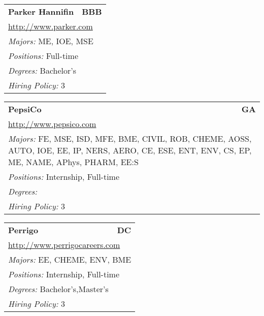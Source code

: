 \documentclass[twoside]{article}
\begin{document}
\begin{center}
\begin{multicols}{3}
\begin{FlushLeft}
\begin{minipage}{\columnwidth}\begin{tabularx}{.95\columnwidth}{Xr}
                 {\Large\bf Parker Hannifin} & {\Large\bf BBB}\\
    \multicolumn{2}{p{.95\columnwidth}}{\url{http://www.parker.com}}\\
    \multicolumn{2}{p{.95\columnwidth}}{\emph{Majors:} ME, IOE, MSE}\\
    \multicolumn{2}{p{.95\columnwidth}}{\emph{Positions:} Full-time}\\
    \multicolumn{2}{p{.95\columnwidth}}{\emph{Degrees:} Bachelor's}\\
    \multicolumn{2}{p{.95\columnwidth}}{\emph{Hiring Policy:} 3}\\
    \end{tabularx}
    
\end{minipage}
 
\begin{minipage}{\columnwidth}\begin{tabularx}{.95\columnwidth}{Xr}
                 {\Large\bf PepsiCo} & {\Large\bf GA}\\
    \multicolumn{2}{p{.95\columnwidth}}{\url{http://www.pepsico.com}}\\
    \multicolumn{2}{p{.95\columnwidth}}{\emph{Majors:} FE, MSE, ISD, MFE, BME, CIVIL, ROB, CHEME, AOSS, AUTO, IOE, EE, IP, NERS, AERO, CE, ESE, ENT, ENV, CS, EP, ME, NAME, APhys, PHARM, EE:S}\\
    \multicolumn{2}{p{.95\columnwidth}}{\emph{Positions:} Internship, Full-time}\\
    \multicolumn{2}{p{.95\columnwidth}}{\emph{Degrees:} }\\
    \multicolumn{2}{p{.95\columnwidth}}{\emph{Hiring Policy:} 3}\\
    \end{tabularx}
    
\end{minipage}
 
\begin{minipage}{\columnwidth}\begin{tabularx}{.95\columnwidth}{Xr}
                 {\Large\bf Perrigo} & {\Large\bf DC}\\
    \multicolumn{2}{p{.95\columnwidth}}{\url{http://www.perrigocareers.com}}\\
    \multicolumn{2}{p{.95\columnwidth}}{\emph{Majors:} EE, CHEME, ENV, BME}\\
    \multicolumn{2}{p{.95\columnwidth}}{\emph{Positions:} Internship, Full-time}\\
    \multicolumn{2}{p{.95\columnwidth}}{\emph{Degrees:} Bachelor's,Master's}\\
    \multicolumn{2}{p{.95\columnwidth}}{\emph{Hiring Policy:} 3}\\
    \end{tabularx}
    

\end{minipage}
\end{FlushLeft}
\end{multicols}
\end{center}
\end{document}
